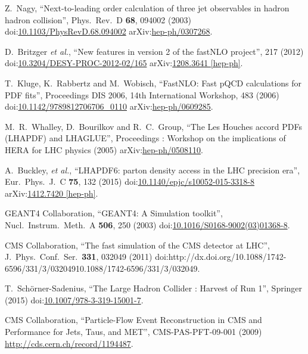 \begin{thebibliography}{99}
Z.~Nagy, ``Next-to-leading order calculation of three jet observables in hadron hadron collision'', Phys.\ Rev.\ D {\bf 68}, 094002 (2003) doi:\href{http://dx.doi.org/10.1103/PhysRevD.68.094002}{10.1103/PhysRevD.68.094002} arXiv:\href{https://arxiv.org/abs/hep-ph/0307268}{hep-ph/0307268}.

D.~Britzger {\it et al.}, ``New features in version 2 of the fastNLO project'', 217 (2012) doi:\href{http://dx.doi.org/10.3204/DESY-PROC-2012-02/165}{10.3204/DESY-PROC-2012-02/165} arXiv:\href{https://arxiv.org/abs/1208.3641}{1208.3641 [hep-ph]}.

T.~Kluge, K.~Rabbertz and M.~Wobisch, ``FastNLO: Fast pQCD calculations for PDF fits'', Proceedings DIS 2006, 14th International Workshop, 483 (2006) doi:\href{http://dx.doi.org/10.1142/9789812706706\_0110}{10.1142/9789812706706\_0110} arXiv:\href{https://arxiv.org/abs/hep-ph/0609285}{hep-ph/0609285}.

M.~R.~Whalley, D.~Bourilkov and R.~C.~Group, ``The Les Houches accord PDFs (LHAPDF) and LHAGLUE'', Proceedings : Workshop on the implications of HERA for LHC physics (2005) arXiv:\href{https://arxiv.org/abs/hep-ph/0508110}{hep-ph/0508110}.

A.~Buckley, {\it et al.}, ``LHAPDF6: parton density access in the LHC precision era'', Eur.\ Phys.\ J.\ C {\bf 75}, 132 (2015) doi:\href{http://dx.doi.org/10.1140/epjc/s10052-015-3318-8}{10.1140/epjc/s10052-015-3318-8} arXiv:\href{https://arxiv.org/abs/1412.7420}{1412.7420 [hep-ph]}.

GEANT4 Collaboration, ``GEANT4: A Simulation toolkit'', Nucl.\ Instrum.\ Meth.\ A {\bf 506}, 250 (2003) doi:\href{http://dx.doi.org/10.1016/S0168-9002(03)01368-8}{10.1016/S0168-9002(03)01368-8}.

CMS Collaboration, ``The fast simulation of the CMS detector at LHC'', J.\ Phys.\ Conf.\ Ser.\  {\bf 331}, 032049 (2011) doi:{http://dx.doi.org/10.1088/1742-6596/331/3/032049}{10.1088/1742-6596/331/3/032049}.

T.~Schörner-Sadenius, ``The Large Hadron Collider : Harvest of Run 1'', Springer (2015) doi:\href{http://dx.doi.org/10.1007/978-3-319-15001-7}{10.1007/978-3-319-15001-7}.

CMS Collaboration, ``Particle-Flow Event Reconstruction in CMS and Performance for Jets, Taus, and MET'', CMS-PAS-PFT-09-001 (2009) \url{http://cds.cern.ch/record/1194487}.


\end{thebibliography}
